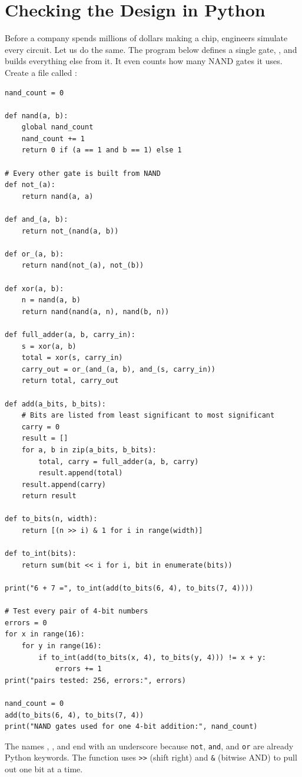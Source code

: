 \section{Checking the Design in Python}
Before a company spends millions of dollars making a chip, engineers simulate every circuit. Let us do the
same. The program below defines a single gate, , and builds everything else from it.
It even counts how many NAND gates it uses. Create a file called :

\begin{verbatim}
nand_count = 0

def nand(a, b):
    global nand_count
    nand_count += 1
    return 0 if (a == 1 and b == 1) else 1

# Every other gate is built from NAND
def not_(a):
    return nand(a, a)

def and_(a, b):
    return not_(nand(a, b))

def or_(a, b):
    return nand(not_(a), not_(b))

def xor(a, b):
    n = nand(a, b)
    return nand(nand(a, n), nand(b, n))

def full_adder(a, b, carry_in):
    s = xor(a, b)
    total = xor(s, carry_in)
    carry_out = or_(and_(a, b), and_(s, carry_in))
    return total, carry_out

def add(a_bits, b_bits):
    # Bits are listed from least significant to most significant
    carry = 0
    result = []
    for a, b in zip(a_bits, b_bits):
        total, carry = full_adder(a, b, carry)
        result.append(total)
    result.append(carry)
    return result

def to_bits(n, width):
    return [(n >> i) & 1 for i in range(width)]

def to_int(bits):
    return sum(bit << i for i, bit in enumerate(bits))

print("6 + 7 =", to_int(add(to_bits(6, 4), to_bits(7, 4))))

# Test every pair of 4-bit numbers
errors = 0
for x in range(16):
    for y in range(16):
        if to_int(add(to_bits(x, 4), to_bits(y, 4))) != x + y:
            errors += 1
print("pairs tested: 256, errors:", errors)

nand_count = 0
add(to_bits(6, 4), to_bits(7, 4))
print("NAND gates used for one 4-bit addition:", nand_count)
\end{verbatim}

The names , , and  end with an underscore because
\texttt{not}, \texttt{and}, and \texttt{or} are already Python keywords. The function 
uses \texttt{>>} (shift right) and \texttt{\&} (bitwise AND) to pull out one bit at a time.

